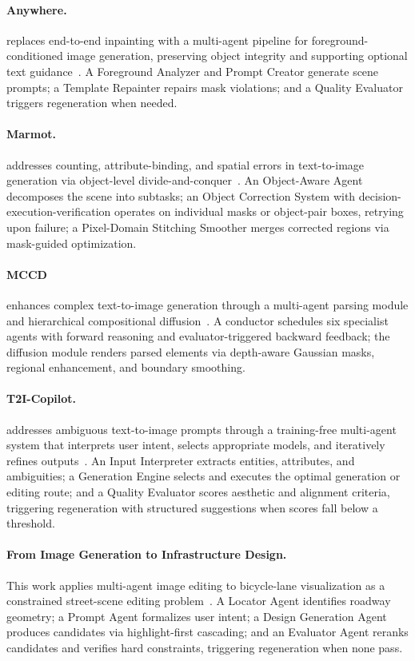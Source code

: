 \paragraph{Anywhere.}
 replaces end-to-end inpainting with a multi-agent pipeline for foreground-conditioned image generation, preserving object integrity and supporting optional text guidance~\cite{xie2024anywhere}. A Foreground Analyzer and Prompt Creator generate scene prompts; a Template Repainter repairs mask violations; and a Quality Evaluator triggers regeneration when needed.

\paragraph{Marmot.}
 addresses counting, attribute-binding, and spatial errors in text-to-image generation via object-level divide-and-conquer~\cite{sun2025marmot}. An Object-Aware Agent decomposes the scene into subtasks; an Object Correction System with decision-execution-verification operates on individual masks or object-pair boxes, retrying upon failure; a Pixel-Domain Stitching Smoother merges corrected regions via mask-guided optimization.

\paragraph{MCCD}
 enhances complex text-to-image generation through a multi-agent parsing module and hierarchical compositional diffusion~\cite{avg250502648}. A conductor schedules six specialist agents with forward reasoning and evaluator-triggered backward feedback; the diffusion module renders parsed elements via depth-aware Gaussian masks, regional enhancement, and boundary smoothing.

\paragraph{T2I-Copilot.}
 addresses ambiguous text-to-image prompts through a training-free multi-agent system that interprets user intent, selects appropriate models, and iteratively refines outputs~\cite{chen2025t2icopilot}. An Input Interpreter extracts entities, attributes, and ambiguities; a Generation Engine selects and executes the optimal generation or editing route; and a Quality Evaluator scores aesthetic and alignment criteria, triggering regeneration with structured suggestions when scores fall below a threshold. 

\paragraph{From Image Generation to Infrastructure Design.}
This work applies multi-agent image editing to bicycle-lane visualization as a constrained street-scene editing problem~\cite{avg250905469}. A Locator Agent identifies roadway geometry; a Prompt Agent formalizes user intent; a Design Generation Agent produces candidates via highlight-first cascading; and an Evaluator Agent reranks candidates and verifies hard constraints, triggering regeneration when none pass.

